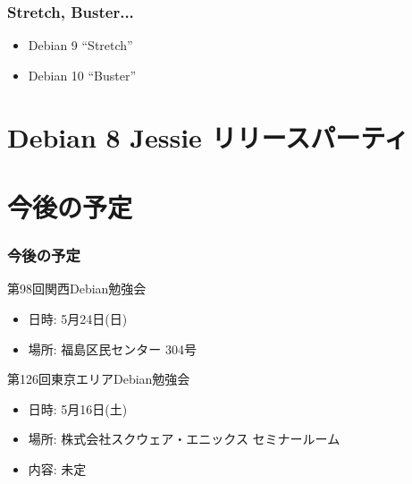 \documentclass[cjk,dvipdfmx,10pt,compress,%
hyperref={bookmarks=true,bookmarksnumbered=true,bookmarksopen=false,%
colorlinks=false,%
pdftitle={第 97 回 関西 Debian 勉強会},%
pdfauthor={倉敷・のがた・佐々木・かわだ},%
pdfsubject={資料},%
}]{beamer}
\begin{document}
\begin{frame}
  \frametitle{ Stretch, Buster... }
  \begin{block}{}
    \begin{itemize}
    \item Debian 9 ``Stretch''
    \item Debian 10 ``Buster''
    \end{itemize}
  \end{block}
\end{frame}


\section{Debian 8 Jessie リリースパーティ}


\section{今後の予定}
\begin{frame}[fragile]
\frametitle{今後の予定}

\begin{block}{第98回関西Debian勉強会}
  \begin{itemize}
  \item 日時: 5月24日(日)
  \item 場所: 福島区民センター 304号
  \end{itemize}
\end{block}

\begin{block}{第126回東京エリアDebian勉強会}
  \begin{itemize}
  \item 日時: 5月16日(土)
  \item 場所: 株式会社スクウェア・エニックス セミナールーム
  \item 内容: 未定
  \end{itemize}
\end{block}

\end{frame}

\takahashi[50]{  }
\end{document}
